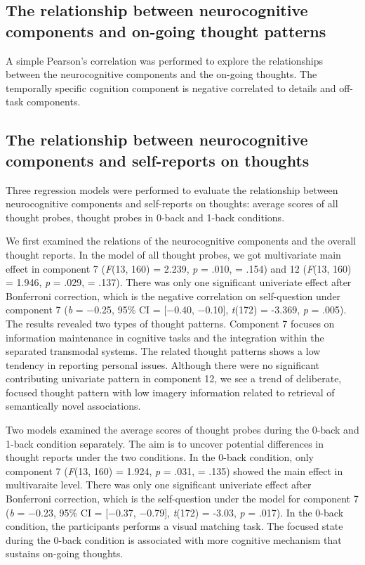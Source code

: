 \subsection{The relationship between neurocognitive components and on-going thought patterns}
A simple Pearson’s correlation was performed to explore the relationships between the neurocognitive components and the on-going thoughts. The temporally specific cognition component is negative correlated to details and off-task components. 




\subsection{The relationship between neurocognitive components and self-reports on thoughts}

Three regression models were performed to evaluate the relationship between neurocognitive components and self-reports on thoughts: average scores of all thought probes, thought probes in 0-back and 1-back conditions. 

We first examined the relations of the neurocognitive components and the overall thought reports. In the model of all thought probes, we got multivariate main effect in component 7 (\textit{F}(13, 160) = 2.239, \textit{p} = .010, \paretasquared = .154)
and 12 (\textit{F}(13, 160) = 1.946, \textit{p} = .029, \paretasquared = .137). There was only one significant univeriate effect after Bonferroni correction, which is the negative correlation on self-question under component 7 
(\textit{b} = −0.25, 95\% CI = [−0.40, −0.10], \textit{t}(172) = -3.369, \textit{p} = .005). The results revealed two types of thought patterns. Component 7 focuses on information maintenance in cognitive tasks and the integration within the separated transmodal systems. The related thought patterns shows a low tendency in reporting personal issues. Although there were no significant contributing univariate pattern in component 12, we see a trend of deliberate, focused thought pattern with low imagery information related to retrieval of semantically novel associations.

Two models examined the average scores of thought probes during the 0-back and 1-back condition separately.  The aim is to uncover potential differences in thought reports under the two conditions. In the 0-back condition, only component 7
(\textit{F}(13, 160) = 1.924, \textit{p} = .031, \paretasquared = .135)
showed the main effect in multivaraite level. There was only one significant univeriate effect after Bonferroni correction, which is the self-question under the model for component 7 
(\textit{b} = −0.23, 95\% CI = [−0.37, −0.79], \textit{t}(172) = -3.03, \textit{p} = .017).
In the 0-back condition, the participants performs a visual matching task. The focused state during the 0-back condition is associated with more cognitive mechanism that sustains on-going thoughts. 

